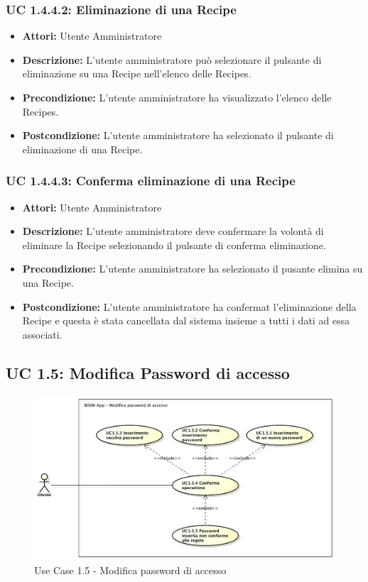 \subsubsection{UC 1.4.4.2: Eliminazione di una Recipe}

\begin{itemize}
    \item \textbf{Attori:} Utente Amministratore
    \item \textbf{Descrizione:} L'utente amministratore può selezionare il pulsante di eliminazione su una Recipe nell'elenco delle Recipes.
    \item \textbf{Precondizione:} L'utente amministratore ha visualizzato l'elenco delle Recipes.
    \item \textbf{Postcondizione:} L'utente amministratore ha selezionato il pulsante di eliminazione di una Recipe.
\end{itemize}
\subsubsection{UC 1.4.4.3: Conferma eliminazione di una Recipe}

\begin{itemize}
    \item \textbf{Attori:} Utente Amministratore
    \item \textbf{Descrizione:} L'utente amministratore deve confermare la volontà di eliminare la Recipe selezionando il pulsante di conferma eliminazione.
    \item \textbf{Precondizione:} L'utente amministratore ha selezionato il pusante elimina su una Recipe.
    \item \textbf{Postcondizione:} L'utente amministratore ha confermat l'eliminazione della Recipe e questa è stata cancellata dal sistema insieme a tutti i dati ad essa associati.
\end{itemize}

\clearpage


\subsection{UC 1.5: Modifica Password di accesso}

\begin{figure}[!htbp]
    \centering
    \centerline{\includegraphics[scale=0.4]{./images/UC1_5.pdf}}
    \caption{Use Case 1.5 - Modifica password di accesso}
\end{figure}

